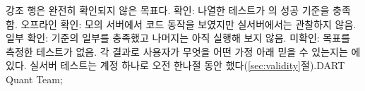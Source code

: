 {{\begin{tabularx}{\linewidth}{>{\RaggedRight\arraybackslash}p{34mm} >{\RaggedRight\arraybackslash}p{46mm} >{\RaggedRight\arraybackslash}X >{\RaggedRight\arraybackslash}p{15mm}}
\end{tabularx}}}{강조 행은 완전히 확인되지 않은 목표다. 확인: 나열한 테스트가 의 성공 기준을 충족함. 오프라인 확인: 모의 서버에서 코드 동작을 보였지만 실서버에서는 관찰하지 않음. 일부 확인: 기준의 일부를 충족했고 나머지는 아직 실행해 보지 않음. 미확인: 목표를 측정한 테스트가 없음. 각 결과로 사용자가 무엇을 어떤 가정 아래 믿을 수 있는지는 에 있다. 실서버 테스트는 계정 하나로 오전 한나절 동안 했다(\ref{sec:validity}절).}{DART Quant Team; }
